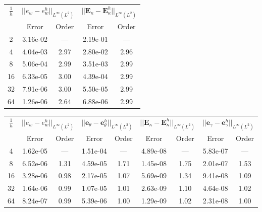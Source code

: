 \begin{table}[hp]
	\centering
	\begin{tabular}{ccccc}
		\hline 
		\multirow{2}{*}{$\frac{1}{h}$} & \multicolumn{2}{c}{$||e_w - e_w^h||_{L^{\infty}(L^2)}$}  & \multicolumn{2}{c}{$||\bm{E}_\kappa - \bm{E}_\kappa^h||_{L^{\infty}(L^2)}$}   \\ 
		& Error & Order  & Error & Order  \\
		\hline 
		2  & 3.16e-02 & ---  & 2.19e-01 & ---  \\ 
		4  & 4.04e-03 & 2.97 & 2.80e-02 & 2.96 \\ 
		8  & 5.06e-04 & 2.99 & 3.51e-03 & 2.99 \\ 
		16 & 6.33e-05 & 3.00 & 4.39e-04 & 2.99 \\ 
		32 & 7.91e-06 & 3.00 & 5.50e-05 & 2.99 \\ 
		64 & 1.26e-06 & 2.64 & 6.88e-06 & 2.99 \\
		\hline 
	\end{tabular} 
	\captionsetup{width=0.95\linewidth}
	\vspace{1mm}
	\label{tab:resebCGCG_k3}
\end{table}	

\begin{table}[hp]
	\centering
	\begin{tabular}{ccccccccc}
		\hline 
		\multirow{2}{*}{$\frac{1}{h}$} & \multicolumn{2}{c}{$||e_w - e_w^h||_{L^{\infty}(L^2)}$}    & \multicolumn{2}{c}{$||\bm{e}_\theta - \bm{e}_\theta^h||_{L^{\infty}(L^2)}$} & \multicolumn{2}{c}{$||\bm{E}_\kappa - \bm{E}_\kappa^h||_{L^{\infty}(L^2)}$} & \multicolumn{2}{c}{$||\bm{e}_\gamma - \bm{e}_\gamma^ h||_{L^{\infty}(L^2)}$}   \\ 
		& Error & Order  & Error & Order  & Error & Order  & Error & Order   \\ 
		\hline 
		4  & 1.62e-05 & ---  & 1.51e-04 & ---  & 4.89e-08 & ---  & 5.83e-07 & --- \\ 
		8  & 6.52e-06 & 1.31 & 4.59e-05 & 1.71 & 1.45e-08 & 1.75 & 2.01e-07 & 1.53\\ 
		16 & 3.28e-06 & 0.98 & 2.17e-05 & 1.07 & 5.69e-09 & 1.34 & 9.41e-08 & 1.09\\ 
		32 & 1.64e-06 & 0.99 & 1.07e-05 & 1.01 & 2.63e-09 & 1.10 & 4.64e-08 & 1.02\\ 
		64 & 8.24e-07 & 0.99 & 5.39e-06 & 1.00 & 1.29e-09 & 1.02 & 2.31e-08 & 1.00\\ 
		\hline 
	\end{tabular} 
	\captionsetup{width=0.95\linewidth}
	\vspace{1mm}
	\label{tab:resminBTJ_k1}
\end{table}

